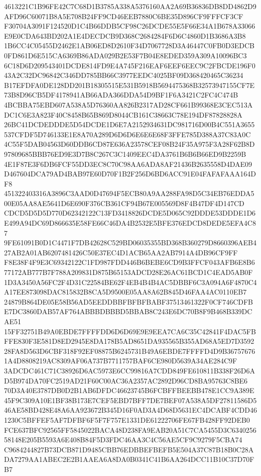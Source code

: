 \documentclass[UTF8,fontset=fandol,zihao=-4,a4paper]{ctexart}
\begin{document}
{{4613221C1B96FE42C7C68D1B3785A338A5376160AA2A69B36836DB8DD4862D9AFD96C60071B8A5E708B24FF9CD46EEB7880C6BE35D896CF9FFFCF3CF
F30704A3091F124520D1C4B66DDB5CF98C26DCDE55E5F66E34A1B678A33066E9E0CDA643BD202A1E4DECDCB9D368C2684284F6D6C4860D1B3686A3B8
1B6CC4C05455D2462E1AB06ED8D2610F34D7067728D3A46447C0FB0D3EDCB0FD861D6E515CA6369B86ADA029B2E53F7B04E8EDED359A309A10096BC3
6C18D6D209543401DCDE814FD9E4A745F216EAF6EEF6EEC9C2FBCDE196F043A2C32DC96842C346DD785BB66C3977EEDC4025BF09D368420465C36234
B17EFDFA0DE128DD201B18305515E531B5918B5694475368B32573947155CF7E73B8D96CB5DF4178941AB66ADA366DDA54D9BF1F6A3421C2FC4C474B
4BCBBA75EBD607A538A5D76360AA826B2317AD28CF661B99368E3CEC513ADC1C6E3A823F40C8458B65B869D8044CB161C38663C78E194DF87828828A
26BC41DCDEDDDE5D54DCDE1D6E7A2152934631DC981716D00B4C551A3655537CFDF5D746133E1E8A70A289D6D6D6E6E6E68F3FFE785D388A37C83A0C
4C55F5DAB04563D60DDB6CD87E636A23578CEF08B24F35A975F3A28F62B8D97809685BBB76ED9E3D7B8C267C3C1409EEC4DA3761B6B6B66ED9B2259B
4E1F87E3F6DB6FCF55DD3EC8C70C98AA6ADA8AF21436B2635558D4DAE09D467604DCA79AD4BAB97E60D70F1B2F256D6BD6ACC91E04FAFAFAAA164DF8
451322403316A3896C3AAD0D47694F5ECB80A9AA288FA98D5C34EB76EDDA500E05AA8AE5641D6E690F376CB361CF94B67E005569D8F4B47DF4D147CD
CDCD5D5D5D770D62342122C13FD3418826DCDE5D065C92DDDE53DDDE1D6E499A94DC69D866635E58FE66C46DA4B2532E5BFE376EDCD8DEDE5EFA4C87
9FE61091B0D1C4471F7DB42628C529BD06035355BD368B360279D8660396AEB427AB2A01AB6207481426C50E37EC4D1ACB65AA2AB7914A4DB96CF9FF
F8E38F4F9E3C69342122C1FD987FDD446B6BEBE6CD9B3FFCF043AFB6E8B677172AB777B7F788A209831D875B65153ADCD28E26AC61BCD1C4EAD5AB0F
1D3A3450A56FC2F4D31C22584BE62F4EB4B4B4AC5DBBF6C3A094A6F4870C4A17EE873098DAC815832B8CA5D9500E05AA8A62B845D46FAA4AC0110EB7
24879B864DE05E58B56AD5EEDDBBFBFBFBABF37513461322F0CF746CDFBE7DC3860DAB57AF764ABBBDBBBD5BBAB8C243E6DC70B8F9B468B339DCAE51
15FF32751B49A0EBDE7FFFFDD6D6D69E9E9EEA7CA6C35C42841F4DAC5FBFFE830F3E581D8ED2945E8DA178B5AD8651DA935565B355AD68A5ED7D3592
28FA8D563D6CBF318F92EF08875B6245731B49A6EBDE7FFFFD4D9B367576761A4D8808219AC8309AF06A737B7711757BAF6CE980D5639A34AE284C9F
3ADCDC461C71C38926D6AC5973E6CC99816A7CDD849FE610811B338F26D6AD5B974DA70FC2519AD21F60C00AC36A2357AC2892D96CD8BA95763C8BE6
70D3A40E3787DB0D2B1AB6DFDC46623745B6FCBFFBEEBB478E1CC9A389E45F9C309A10E1BF38B173E7CEF5EBD7BFF7DE7BEF07A538A5DF27811586D5
46AE58BD428E48A6AA923672B345D16F0AD3A4D68D5631EC4DCABF4CDD461230C5BFFEF5AF7DFBF6F5F7F757E1331DE61222706FE67FB428FF92DEB0
FCE637BFC92565FF5845022BACA48D238FA9EAB20A51C7CA5455D3C634025658148E205B5593A6E408B84F5D3FDC46AA3C4C56AE5CF9C9279F5CBA74
C9684244827B73DCB871D9485CBB76EDBBEFBEFB5E504A37C87B18B0C28ADA7279AA1ABEC2E2B1AAEA6A8DA0B0341C41B6AA264DCC11B10C37D70FB7
}}
\end{document}
